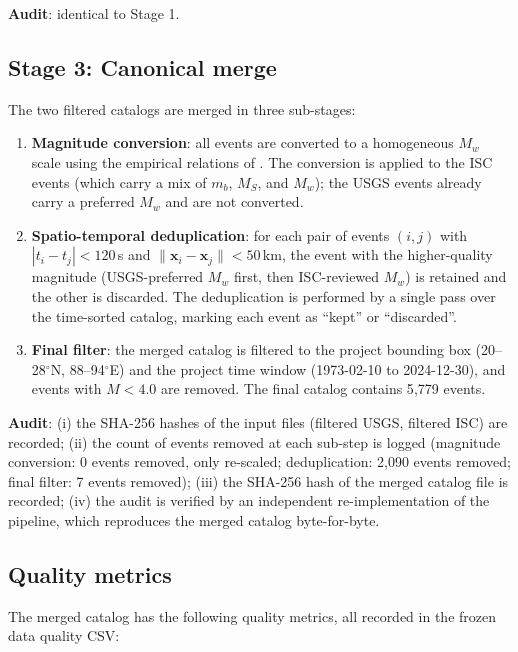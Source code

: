\documentclass[10pt,a4paper,twocolumn]{article}
\begin{document}
\textbf{Audit}: identical to Stage 1.

\subsection{Stage 3: Canonical merge}

The two filtered catalogs are merged in three sub-stages:

\begin{enumerate}[leftmargin=1.2em,itemsep=2pt,topsep=2pt]
\item \textbf{Magnitude conversion}: all events are converted to a homogeneous $M_w$ scale using the empirical relations of \cite{scordilis2006}. The conversion is applied to the ISC events (which carry a mix of $m_b$, $M_S$, and $M_w$); the USGS events already carry a preferred $M_w$ and are not converted.
\item \textbf{Spatio-temporal deduplication}: for each pair of events $(i, j)$ with $|t_i - t_j| < 120$\,s and $\|\mathbf{x}_i - \mathbf{x}_j\| < 50$\,km, the event with the higher-quality magnitude (USGS-preferred $M_w$ first, then ISC-reviewed $M_w$) is retained and the other is discarded. The deduplication is performed by a single pass over the time-sorted catalog, marking each event as ``kept'' or ``discarded''.
\item \textbf{Final filter}: the merged catalog is filtered to the project bounding box (20--28$^\circ$N, 88--94$^\circ$E) and the project time window (1973-02-10 to 2024-12-30), and events with $M < 4.0$ are removed. The final catalog contains 5{,}779 events.
\end{enumerate}

\textbf{Audit}: (i) the SHA-256 hashes of the input files (filtered USGS, filtered ISC) are recorded; (ii) the count of events removed at each sub-step is logged (magnitude conversion: 0 events removed, only re-scaled; deduplication: 2{,}090 events removed; final filter: 7 events removed); (iii) the SHA-256 hash of the merged catalog file is recorded; (iv) the audit is verified by an independent re-implementation of the pipeline, which reproduces the merged catalog byte-for-byte.

\subsection{Quality metrics}

The merged catalog has the following quality metrics, all recorded in the frozen data quality CSV:
\end{document}

